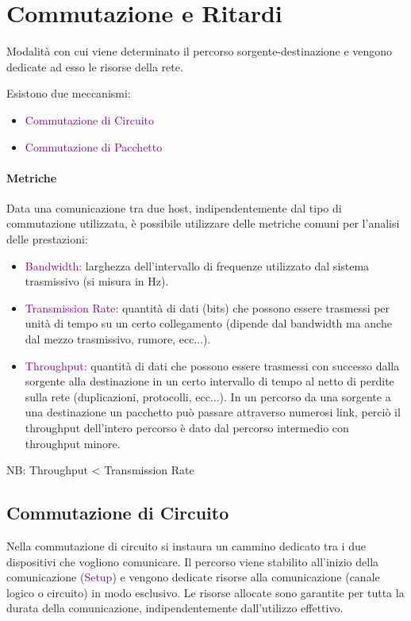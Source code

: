 \section{Commutazione e Ritardi}

    \begin{definition}[Commutazione]
        Modalità con cui viene determinato il percorso sorgente-destinazione e vengono dedicate ad esso le risorse della rete.
    \end{definition}

    Esistono due meccanismi:
    \begin{itemize}
        \item \textcolor{purple}{Commutazione di Circuito}
        \item \textcolor{purple}{Commutazione di Pacchetto}
    \end{itemize}

    \paragraph{Metriche}Data una comunicazione tra due host, indipendentemente dal tipo di commutazione utilizzata, è possibile utilizzare delle metriche comuni per l'analisi delle prestazioni:
    \begin{itemize}
        \item \textcolor{purple}{Bandwidth:} larghezza dell’intervallo di frequenze utilizzato dal sistema trasmissivo (si misura in Hz).
        \item \textcolor{purple}{Transmission Rate:} quantità di dati (bits) che possono essere trasmessi per unità di tempo su un certo collegamento (dipende dal bandwidth ma anche dal mezzo trasmissivo, rumore, ecc...).
        \item \textcolor{purple}{Throughput:} quantità di dati che possono essere trasmessi con successo dalla sorgente alla destinazione in un certo intervallo di tempo al netto di perdite sulla rete (duplicazioni, protocolli, ecc...).
        \newline
        In un percorso da una sorgente a una destinazione un pacchetto può passare attraverso numerosi link, perciò il throughput dell'intero percorso è dato dal percorso intermedio con throughput minore.
    \end{itemize}

    NB: Throughput < Transmission Rate
        

    \subsection{Commutazione di Circuito}   
    Nella commutazione di circuito si instaura un cammino dedicato tra i due dispositivi che vogliono comunicare. Il percorso viene stabilito all’inizio della comunicazione (\textcolor{purple}{Setup}) e vengono dedicate risorse alla comunicazione (canale logico o circuito) in modo esclusivo. Le risorse allocate sono garantite per tutta la durata della comunicazione, indipendentemente dall’utilizzo effettivo.
